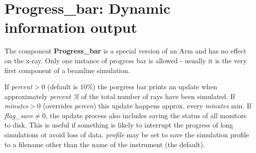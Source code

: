 \section{Progress\_bar: Dynamic information output}
\label{s:progress-bar}

The component \textbf{Progress\_bar} is a special version of an Arm and has no effect on the x-ray.
Only one instance of progress bar is allowed - usually it is the very first component of a beamline simulation.

If \textit{percent}$>0$ (default is $10\%$) the porgress bar prints an update when approximately \textit{percent \% } of the total number of rays
have been simulated. If \textit{minutes}$>0$ (overrides \textit{percen}) this update happens approx. every \textit{minutes} min.
If \textit{flag\_save}$\ne 0$, the update process also includes saving the status of all monitors to disk. This is useful if something is likely to interrupt the progress of long simulations ot avoid loss of data.
\textit{profile} may be set to save the simulation profile to a filename other than the name of the instrument (the default).
